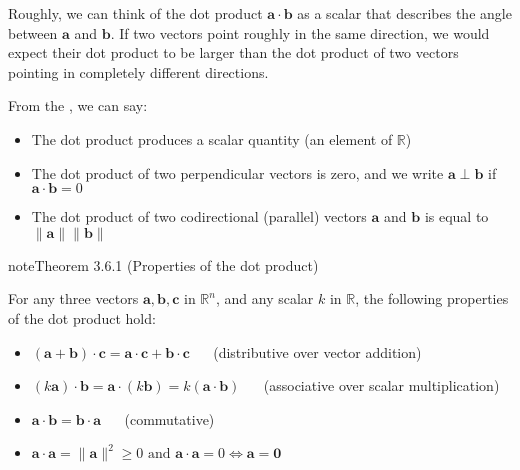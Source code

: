 \documentclass[letterpaper,10pt,english]{jupyterBook}
\begin{document}
\sphinxAtStartPar
Roughly, we can think of the dot product \(\mathbf{a} \cdot \mathbf{b}\) as a scalar that describes the angle between \(\mathbf{a}\) and \(\mathbf{b}\). If two vectors point roughly in the same direction, we would expect their dot product to be larger than the dot product of two vectors pointing in completely different directions.

\sphinxAtStartPar
From the {\hyperref[\detokenize{_pages/3.3_Dot_and_cross_products:dot-product-definition}]{}}, we can say:
\begin{itemize}
\item {} 
\sphinxAtStartPar
The dot product produces a scalar quantity (an element of \(\mathbb{R}\))

\item {} 
\sphinxAtStartPar
The dot product of two perpendicular vectors is zero, and we write \(\mathbf{a}\perp\mathbf{b}\) if \(\mathbf{a}\cdot\mathbf{b}=0\)

\item {} 
\sphinxAtStartPar
The dot product of two co\sphinxhyphen{}directional (parallel) vectors \(\mathbf{a}\) and \(\mathbf{b}\) is equal to \(\|\mathbf{a}\| \|\mathbf{b}\|\)

\end{itemize}
\label{_pages/3.3_Dot_and_cross_products:dot-product-properties-theorem}
\begin{sphinxadmonition}{note}{Theorem 3.6.1 (Properties of the dot product)}



\sphinxAtStartPar
For any three vectors \(\mathbf{a},\mathbf{b},\mathbf{c}\) in \(\mathbb{R}^n\), and any scalar \(k\) in \(\mathbb{R}\), the following properties of the dot product hold:
\begin{itemize}
\item {} 
\sphinxAtStartPar
\((\mathbf{a} + \mathbf{b})\cdot \mathbf{c} = \mathbf{a} \cdot \mathbf{c} + \mathbf{b} \cdot \mathbf{c}\)   (distributive over vector addition)

\item {} 
\sphinxAtStartPar
\((k \mathbf{a})\cdot \mathbf{b} = \mathbf{a} \cdot (k \mathbf{b})= k (\mathbf{a} \cdot \mathbf{b})\)   (associative over scalar multiplication)

\item {} 
\sphinxAtStartPar
\(\mathbf{a} \cdot \mathbf{b} = \mathbf{b} \cdot \mathbf{a}\)   (commutative)

\item {} 
\sphinxAtStartPar
\(\mathbf{a} \cdot \mathbf{a} = \|\mathbf{a}\|^2 \geq 0 \text{ and } \mathbf{a} \cdot \mathbf{a} = 0 \iff \mathbf{a} = \mathbf{0}\)

\end{itemize}
\end{sphinxadmonition}
\end{document}
